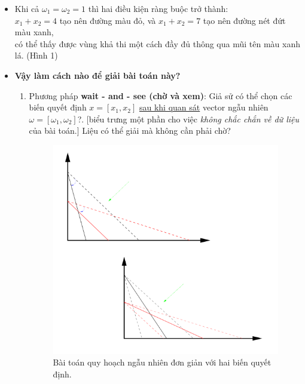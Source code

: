 \documentclass[a4paper]{article}
\begin{document}
            \begin{itemize}
                \item Khi cả $\omega_{1} = \omega_{2} = 1$ thì hai điều kiện ràng buộc trở thành:\\
                $x_{1} + x_{2} = 4$ tạo nên đường màu đỏ, và $x_{1} + x_{2} = 7$ tạo nên đường nét đứt màu xanh,\\
                có thể thấy được vùng khả thi một cách đầy đủ thông qua mũi tên màu xanh lá. (Hình 1)\\
                \item \textbf{Vậy làm cách nào để giải bài toán này?}
                \begin{enumerate}
                    \item Phương pháp \textbf{wait - and - see (chờ và xem)}: Giả sử có thể chọn các biến quyết định
                    $x=[x_{1},x_{2}]$ \underline{sau khi quan sát} vector ngẫu nhiên $\omega=[\omega_{1},\omega_{2}]$?.
                    [biểu trưng một phần cho việc \textit{không chắc chắn về dữ liệu} của bài toán.]
                    Liệu có thể giải mà không cần phải chờ?
                    \begin{figure}[ht]
                        \centering
                        \includegraphics{plot.png}
                        \caption{Bài toán quy hoạch ngẫu nhiên đơn giản với hai biến quyết định.}
                    \end{figure}

\end{enumerate}
\end{itemize}
\end{document}
